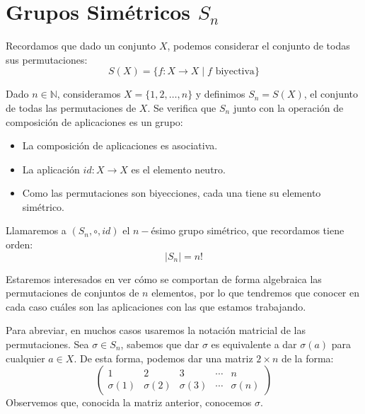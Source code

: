 \section{Grupos Simétricos $S_n$}
Recordamos que dado un conjunto $X$, podemos considerar el conjunto de todas sus permutaciones:
\begin{equation*}
    S(X) = \{f:X\rightarrow X\mid f \text{\ biyectiva}\}
\end{equation*}

\begin{definicion}
    Dado $n\in \mathbb{N}$, consideramos $X=\{1,2,\ldots,n\}$ y definimos $S_n = S(X)$, el conjunto de todas las permutaciones de $X$. Se verifica que $S_n$ junto con la operación de composición de aplicaciones es un grupo:
    \begin{itemize}
        \item La composición de aplicaciones es asociativa.
        \item La aplicación $id:X\rightarrow X$ es el elemento neutro.
        \item Como las permutaciones son biyecciones, cada una tiene su elemento simétrico.
    \end{itemize}
    Llamaremos a $(S_n,\circ,id)$ el $n-$ésimo grupo simétrico, que recordamos tiene orden:
    \begin{equation*}
        |S_n| = n!
    \end{equation*}
\end{definicion}

\begin{notacion}
Estaremos interesados en ver cómo se comportan de forma algebraica las permutaciones de conjuntos de $n$ elementos, por lo que tendremos que conocer en cada caso cuáles son las aplicaciones con las que estamos trabajando.

Para abreviar, en muchos casos usaremos la notación matricial de las permutaciones. Sea $\sigma\in S_n$, sabemos que dar $\sigma$ es equivalente a dar $\sigma(a)$ para cualquier $a\in X$. De esta forma, podemos dar una matriz $2\times n$ de la forma:
\begin{equation*}
    \left(\begin{array}{ccccc}
        1 & 2 & 3 & \cdots & n \\
        \sigma(1) & \sigma(2) & \sigma(3) & \cdots & \sigma(n)
    \end{array}\right)
\end{equation*}
Observemos que, conocida la matriz anterior, conocemos $\sigma$.
\end{notacion}

